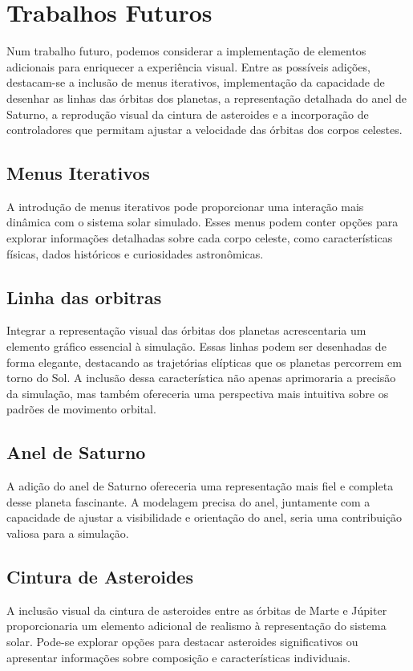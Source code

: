 \documentclass[12pt,a4paper]{memoir}
\begin{document}
\newpage



 \chapter{Trabalhos Futuros}
\label{chap:conclusao}
Num trabalho futuro, podemos considerar a implementação de elementos adicionais para enriquecer a experiência visual. Entre as possíveis adições, destacam-se a inclusão de menus iterativos, implementação da capacidade de desenhar as linhas das órbitas dos planetas, a representação detalhada do anel de Saturno, a reprodução visual da cintura de asteroides e a incorporação de controladores que permitam ajustar a velocidade das órbitas dos corpos celestes.

\section{Menus Iterativos}
A introdução de menus iterativos pode proporcionar uma interação mais dinâmica com o sistema solar simulado. Esses menus podem conter opções para explorar informações detalhadas sobre cada corpo celeste, como características físicas, dados históricos e curiosidades astronômicas.

\section{Linha das orbitras}

Integrar a representação visual das órbitas dos planetas acrescentaria um elemento gráfico essencial à simulação. Essas linhas podem ser desenhadas de forma elegante, destacando as trajetórias elípticas que os planetas percorrem em torno do Sol. A inclusão dessa característica não apenas aprimoraria a precisão da simulação, mas também ofereceria uma perspectiva mais intuitiva sobre os padrões de movimento orbital.

\newpage

\section{Anel de Saturno}
A adição do anel de Saturno ofereceria uma representação mais fiel e completa desse planeta fascinante. A modelagem precisa do anel, juntamente com a capacidade de ajustar a visibilidade e orientação do anel, seria uma contribuição valiosa para a simulação.

\section{Cintura de Asteroides}
A inclusão visual da cintura de asteroides entre as órbitas de Marte e Júpiter proporcionaria um elemento adicional de realismo à representação do sistema solar. Pode-se explorar opções para destacar asteroides significativos ou apresentar informações sobre composição e características individuais.
\end{document}
